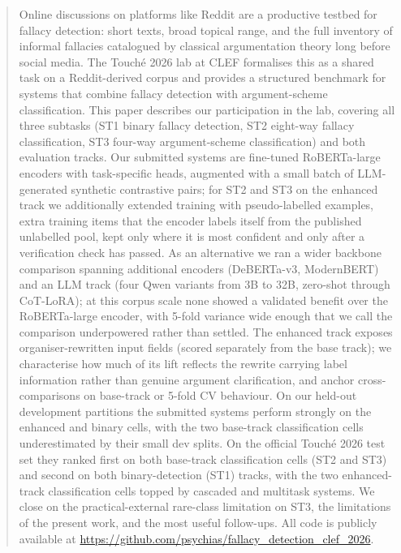 \documentclass{ceurart}
\begin{document}
\begin{abstract}
Online discussions on platforms like Reddit are a productive testbed for fallacy detection: short texts, broad topical range, and the full inventory of informal fallacies catalogued by classical argumentation theory long before social media. The Touch\'{e} 2026 lab at CLEF formalises this as a shared task on a Reddit-derived corpus and provides a structured benchmark for systems that combine fallacy detection with argument-scheme classification. This paper describes our participation in the lab, covering all three subtasks (ST1 binary fallacy detection, ST2 eight-way fallacy classification, ST3 four-way argument-scheme classification) and both evaluation tracks. Our submitted systems are fine-tuned RoBERTa-large encoders with task-specific heads, augmented with a small batch of LLM-generated synthetic contrastive pairs; for ST2 and ST3 on the enhanced track we additionally extended training with pseudo-labelled examples, extra training items that the encoder labels itself from the published unlabelled pool, kept only where it is most confident and only after a verification check has passed. As an alternative we ran a wider backbone comparison spanning additional encoders (DeBERTa-v3, ModernBERT) and an LLM track (four Qwen variants from 3B to 32B, zero-shot through CoT-LoRA); at this corpus scale none showed a validated benefit over the RoBERTa-large encoder, with 5-fold variance wide enough that we call the comparison underpowered rather than settled. The enhanced track exposes organiser-rewritten input fields (scored separately from the base track); we characterise how much of its lift reflects the rewrite carrying label information rather than genuine argument clarification, and anchor cross-comparisons on base-track or 5-fold CV behaviour. On our held-out development partitions the submitted systems perform strongly on the enhanced and binary cells, with the two base-track classification cells underestimated by their small dev splits. On the official Touch\'{e} 2026 test set they ranked first on both base-track classification cells (ST2 and ST3) and second on both binary-detection (ST1) tracks, with the two enhanced-track classification cells topped by cascaded and multitask systems. We close on the practical-external rare-class limitation on ST3, the limitations of the present work, and the most useful follow-ups. All code is publicly available at \url{https://github.com/psychias/fallacy_detection_clef_2026}.
\end{abstract}
\end{document}
